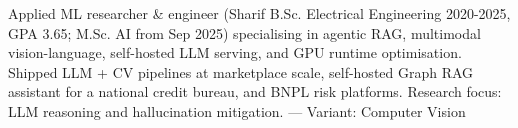 \small{Applied ML researcher \& engineer (Sharif B.Sc. Electrical Engineering 2020-2025, GPA 3.65; M.Sc. AI from Sep 2025) specialising in agentic RAG, multimodal vision-language, self-hosted LLM serving, and GPU runtime optimisation. Shipped LLM + CV pipelines at marketplace scale, self-hosted Graph RAG assistant for a national credit bureau, and BNPL risk platforms. Research focus: LLM reasoning and hallucination mitigation.
 — Variant: Computer Vision}

